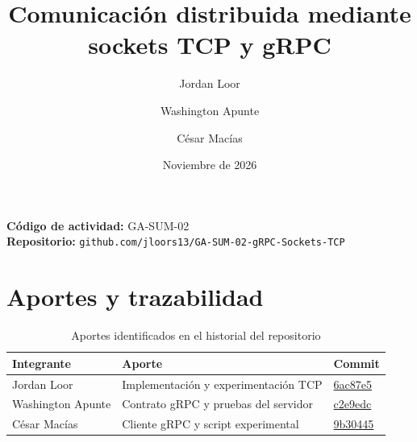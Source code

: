 \documentclass[12pt,a4paper]{article}
\title{Comunicación distribuida mediante sockets TCP y gRPC}
\author{Jordan Loor \and Washington Apunte \and César Macías}
\date{Noviembre de 2026}
\begin{document}
\sloppy
{}
\maketitle
\begin{center}
\textbf{Código de actividad:} GA-SUM-02\\
\textbf{Repositorio:} \texttt{github.com/jloors13/GA-SUM-02-gRPC-Sockets-TCP}
\end{center}
\tableofcontents
\clearpage
{}










\section{Aportes y trazabilidad}
\begin{table}[htbp]
\centering
\caption{Aportes identificados en el historial del repositorio}
\begin{tabular}{p{2.6cm}p{7.2cm}l}
\toprule
Integrante & Aporte & Commit \\
\midrule
Jordan Loor & Implementación y experimentación TCP & \href{https://github.com/jloors13/GA-SUM-02-gRPC-Sockets-TCP/commit/6ac87e5}{6ac87e5} \\
Washington Apunte & Contrato gRPC y pruebas del servidor & \href{https://github.com/jloors13/GA-SUM-02-gRPC-Sockets-TCP/commit/c2e9edc}{c2e9edc} \\
César Macías & Cliente gRPC y script experimental & \href{https://github.com/jloors13/GA-SUM-02-gRPC-Sockets-TCP/commit/9b30445}{9b30445} \\
\bottomrule
\end{tabular}
\end{table}

\printbibliography[heading=bibintoc,title={Referencias}]
\end{document}
